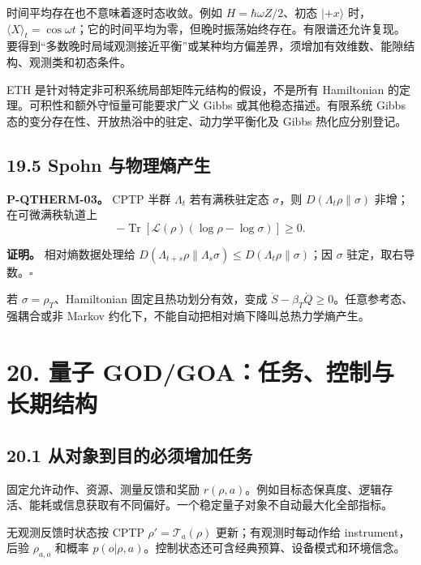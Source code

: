 \documentclass[
  11pt,
  oneside]{book}
\begin{document}
时间平均存在也不意味着逐时态收敛。例如 \(H=\hbar\omega Z/2\)、初态
\(|+x\rangle\)
时，\(\langle X\rangle_t=\cos\omega t\)；它的时间平均为零，但晚时振荡始终存在。有限谱还允许复现。要得到``多数晚时局域观测接近平衡''或某种均方偏差界，须增加有效维数、能隙结构、观测类和初态条件。

ETH 是针对特定非可积系统局部矩阵元结构的假设，不是所有 Hamiltonian
的定理。可积性和额外守恒量可能要求广义 Gibbs 或其他稳态描述。有限系统
Gibbs 态的变分存在性、开放热浴中的驻定、动力学平衡化及 Gibbs
热化应分别登记。

\hypertarget{spohn-ux4e0eux7269ux7406ux71b5ux4ea7ux751f}{%
\section{19.5 Spohn
与物理熵产生}\label{spohn-ux4e0eux7269ux7406ux71b5ux4ea7ux751f}}

\protect\hypertarget{p-qtherm-03}{}{}

\textbf{P-QTHERM-03。} CPTP 半群 \(\Lambda_t\) 若有满秩驻定态
\(\sigma\)，则 \(D(\Lambda_t\rho\|\sigma)\) 非增；在可微满秩轨道上 \[
-\operatorname{Tr}[\mathcal L(\rho)(\log\rho-\log\sigma)]\ge0.
\]

\textbf{证明。} 相对熵数据处理给
\(D(\Lambda_{t+s}\rho\|\Lambda_s\sigma) \le D(\Lambda_t\rho\|\sigma)\)；因
\(\sigma\) 驻定，取右导数。\(\square\)

若 \(\sigma=\rho_T\)、Hamiltonian 固定且热功划分有效，变成
\(\dot S-\beta_T\dot Q\ge0\)。任意参考态、强耦合或非 Markov
约化下，不能自动把相对熵下降叫总热力学熵产生。

\hypertarget{ch-20}{%
\chapter{20. 量子 GOD/GOA：任务、控制与长期结构}\label{ch-20}}

\hypertarget{ux4eceux5bf9ux8c61ux5230ux76eeux7684ux5fc5ux987bux589eux52a0ux4efbux52a1}{%
\section{20.1
从对象到目的必须增加任务}\label{ux4eceux5bf9ux8c61ux5230ux76eeux7684ux5fc5ux987bux589eux52a0ux4efbux52a1}}

固定允许动作、资源、测量反馈和奖励
\(r(\rho,a)\)。例如目标态保真度、逻辑存活、能耗或信息获取有不同偏好。一个稳定量子对象不自动最大化全部指标。

无观测反馈时状态按 CPTP \(\rho'=\mathcal T_a(\rho)\)
更新；有观测时每动作给 instrument，后验 \(\rho_{a,o}\) 和概率
\(p(o|\rho,a)\)。控制状态还可含经典预算、设备模式和环境信念。
\end{document}

